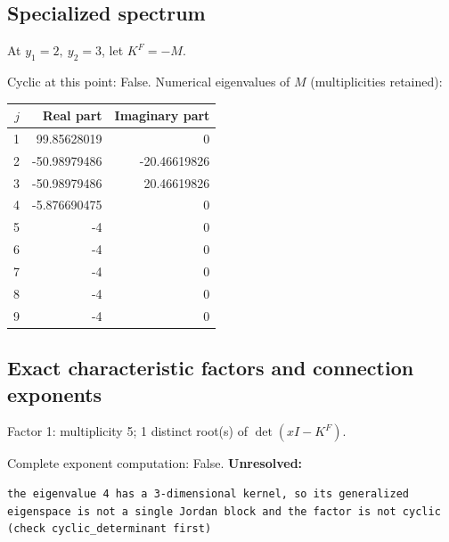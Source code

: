 \documentclass[10pt,a4paper]{article}
\newcommand{\fitmath}[1]{\sbox{\mathbox}{$\displaystyle #1$}\ifdim\wd\mathbox>\linewidth\resizebox{\linewidth}{!}{\usebox{\mathbox}}\else\usebox{\mathbox}\fi}
\begin{document}
\subsection*{Specialized spectrum}
At $y_1=2,\ y_2=3$, let $K^F=-M$.
\begin{center}\fitmath{\Delta=0}\end{center}
Cyclic at this point: False.
Numerical eigenvalues of $M$ (multiplicities retained):
\begin{center}\small\begin{tabular}{rrr}\toprule $j$ & Real part & Imaginary part\\\midrule
1 & 99.85628019 & 0\\
2 & -50.98979486 & -20.46619826\\
3 & -50.98979486 & 20.46619826\\
4 & -5.876690475 & 0\\
5 & -4 & 0\\
6 & -4 & 0\\
7 & -4 & 0\\
8 & -4 & 0\\
9 & -4 & 0\\
\bottomrule\end{tabular}\end{center}
\subsection*{Exact characteristic factors and connection exponents}
Factor 1: multiplicity 5; 1 distinct root(s) of $\det(xI-K^F)$.
\begin{center}\fitmath{\begin{aligned}p_{1}(x)&=x - 4\end{aligned}}\end{center}
Complete exponent computation: False.
\textbf{Unresolved:}

\begin{lstlisting}
the eigenvalue 4 has a 3-dimensional kernel, so its generalized eigenspace is not a single Jordan block and the factor is not cyclic (check cyclic_determinant first)
\end{lstlisting}
\end{document}
